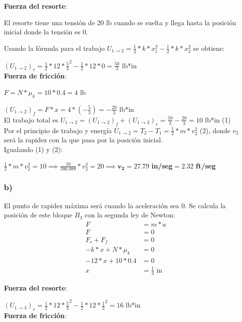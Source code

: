 \documentclass[12pt,fleqn]{article}
\begin{document}
\textbf{Fuerza del resorte}:

El resorte tiene una tensión de 20 lb cuando se suelta y llega hasta la posición inicial donde la tensión es 0.

Usando la fórmula para el trabajo $U_{1\rightarrow 2}=\frac{1}{2}*k*x_1^2-\frac{1}{2}*k*x_2^2$ se obtiene:

$(U_{1\rightarrow 2})_r=\frac{1}{2}*12*\frac{5}{3}^2-\frac{1}{2}*12*0=\frac{50}{3}$ lb*in\\

\textbf{Fuerza de fricción}:

$F=N*\mu_k=10*0.4=4$ lb

$(U_{1\rightarrow 2})_f=F*x=4*(-\frac{5}{3})=-\frac{20}{3}$ lb*in\\

El trabajo total es $U_{1\rightarrow 2}=(U_{1\rightarrow 2})_f+(U_{1\rightarrow 2})_r=\frac{50}{3}-\frac{20}{3}=10$ lb*in (1)\\

Por el principio de trabajo y energía $U_{1\rightarrow 2}=T_2-T_1=\frac{1}{2}*m*v_2^2$ (2), donde $v_2$ será la rapidez con la que pasa por la posición inicial.\\

Igualando (1) y (2):

$\frac{1}{2}*m*v_2^2=10\implies \frac{10}{386.088}*v_2^2=20\implies \mathbf{v_2=27.79}$ \textbf{in/seg}$\mathbf{=2.32}$ \textbf{ft/seg}
\subsubsection*{b)}
El punto de rapidez máxima será cuando la aceleración sea 0. Se calcula la posición de este bloque $B_3$ con la segunda ley de Newton:
\begin{align*}
  F&=m*a\\
  F&=0\tag{a=0}\\
  F_r+F_f&=0\tag{Fuerzas de fricción y del resorte}\\
  -k*x+N*\mu_k&=0\\
  -12*x+10*0.4&=0\\
  x&=\frac{1}{3}\textrm{ in}
\end{align*}

\textbf{Fuerza del resorte}:

$(U_{1\rightarrow 3})_r=\frac{1}{2}*12*\frac{5}{3}^2-\frac{1}{2}*12*\frac{1}{3}^2=16$ lb*in\\

\textbf{Fuerza de fricción}:
\end{document}
